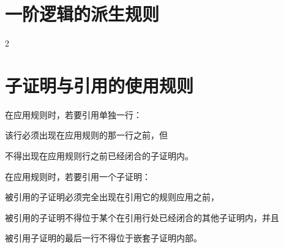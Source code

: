 \section{一阶逻辑的派生规则}

\begin{multicols}{2}
\begin{fitchproof}
\end{fitchproof}
\begin{fitchproof}
\end{fitchproof}
\begin{fitchproof}
\end{fitchproof}
\begin{fitchproof}
\end{fitchproof}
\end{multicols}



\section{子证明与引用的使用规则}

在应用规则时，若要引用单独一行：

\begin{compactlist}
\item 该行必须出现在应用规则的那一行之前，但
\item 不得出现在应用规则行之前已经闭合的子证明内。
\end{compactlist}


在应用规则时，若要引用一个子证明：

\begin{compactlist}
\item 被引用的子证明必须完全出现在引用它的规则应用之前，
\item 被引用的子证明不得位于某个在引用行处已经闭合的其他子证明内，并且
\item 被引用子证明的最后一行不得位于嵌套子证明内部。
\end{compactlist}

